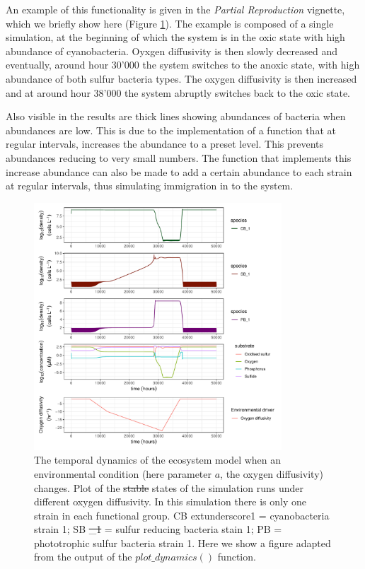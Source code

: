 \documentclass[]{elsarticle} %
\providecommand{\DIFaddtex}[1]{{\protect\color{blue}\uwave{#1}}} %
\providecommand{\DIFdeltex}[1]{{\protect\color{red}\sout{#1}}}                      %
\providecommand{\DIFaddbegin}{} %
\providecommand{\DIFaddend}{} %
\providecommand{\DIFaddFL}[1]{\DIFadd{#1}} %
\providecommand{\DIFdelFL}[1]{\DIFdel{#1}} %
\providecommand{\DIFaddbeginFL}{} %
\providecommand{\DIFaddendFL}{} %
\providecommand{\DIFdelbeginFL}{} %
\providecommand{\DIFdelendFL}{} %
\providecommand{\DIFadd}[1]{\texorpdfstring{\DIFaddtex{#1}}{#1}} %
\providecommand{\DIFdel}[1]{\texorpdfstring{\DIFdeltex{#1}}{}} %
\newcommand{\DIFscaledelfig}{0.5}
\newlength{\DIFdelgraphicswidth} %
\newlength{\DIFdelgraphicsheight} %
\newcommand{\DIFaddincludegraphics}[2][]{{\color{blue}\fbox{\DIFOincludegraphics[#1]{#2}}}} %
\newcommand{\DIFdelincludegraphics}[2][]{%
\sbox{\DIFdelgraphicsbox}{\DIFOincludegraphics[#1]{#2}}%
\settoboxwidth{\DIFdelgraphicswidth}{\DIFdelgraphicsbox} %
\settoboxtotalheight{\DIFdelgraphicsheight}{\DIFdelgraphicsbox} %
\scalebox{\DIFscaledelfig}{%
\parbox[b]{\DIFdelgraphicswidth}{\usebox{\DIFdelgraphicsbox}\\[-\baselineskip] \rule{\DIFdelgraphicswidth}{0em}}\llap{\resizebox{\DIFdelgraphicswidth}{\DIFdelgraphicsheight}{%
\setlength{\unitlength}{\DIFdelgraphicswidth}%
\begin{picture}(1,1)%
\thicklines\linethickness{2pt} %
{\color[rgb]{1,0,0}\put(0,0){\framebox(1,1){}}}%
{\color[rgb]{1,0,0}\put(0,0){\line( 1,1){1}}}%
{\color[rgb]{1,0,0}\put(0,1){\line(1,-1){1}}}%
\end{picture}%
}\hspace*{3pt}}} %
} %
\DeclareRobustCommand{\DIFaddbegin}{\DIFOaddbegin \let\includegraphics\DIFaddincludegraphics} %
\DeclareRobustCommand{\DIFaddend}{\DIFOaddend \let\includegraphics\DIFOincludegraphics} %
\DeclareRobustCommand{\DIFaddbeginFL}{\DIFOaddbeginFL \let\includegraphics\DIFaddincludegraphics} %
\DeclareRobustCommand{\DIFaddendFL}{\DIFOaddendFL \let\includegraphics\DIFOincludegraphics} %
\DeclareRobustCommand{\DIFdelbeginFL}{\DIFOdelbeginFL \let\includegraphics\DIFdelincludegraphics} %
\DeclareRobustCommand{\DIFdelendFL}{\DIFOaddendFL \let\includegraphics\DIFOincludegraphics} %
\begin{document}
An example of this functionality is given in the \emph{Partial Reproduction} vignette, which we briefly \DIFaddbegin \DIFadd{describe and }\DIFaddend show here (Figure \ref{fig:uc1}). The example is composed of a single simulation, at the beginning of which the system is in the oxic state with high abundance of cyanobacteria. Oyxgen diffusivity is then slowly decreased and eventually, around hour 30'000 the system switches to the anoxic state, with high abundance of both sulfur bacteria types. The oxygen diffusivity is then increased and at around hour 38'000 the system abruptly switches back to the oxic state.

Also visible in the results are thick lines showing abundances of bacteria when abundances are low. This is due to the implementation of a function that at regular intervals, increases the abundance to a preset level. This prevents abundances reducing to very small numbers. The function that implements this increase abundance can also be made to add a certain abundance to each strain at regular intervals, thus simulating immigration in to the system.

\begin{figure}

{\centering \DIFdelbeginFL %
\DIFdelendFL \DIFaddbeginFL \includegraphics[width=350px]{./figures/gen_uc1_partrep_temporal_state_switching} 
\DIFaddendFL 

}

\caption{The temporal dynamics of the ecosystem model when an environmental condition (here parameter $a$, the oxygen diffusivity) changes. Plot of the \DIFdelbeginFL \DIFdelFL{stable }\DIFdelendFL \DIFaddbeginFL \DIFaddFL{final }\DIFaddendFL states of the simulation runs under different oxygen diffusivity. In this simulation there is only one strain in each functional group. CB    extunderscore1 = cyanobacteria strain 1; SB \DIFdelbeginFL \DIFdelFL{\_1 }\DIFdelendFL \DIFaddbeginFL \DIFaddFL{extunderscore1 }\DIFaddendFL = sulfur reducing bacteria stain 1; PB = phototrophic sulfur bacteria strain 1. Here we show a figure adapted from the output of the $plot\_dynamics()$  function.}\label{fig:uc1}
\end{figure}
\end{document}
